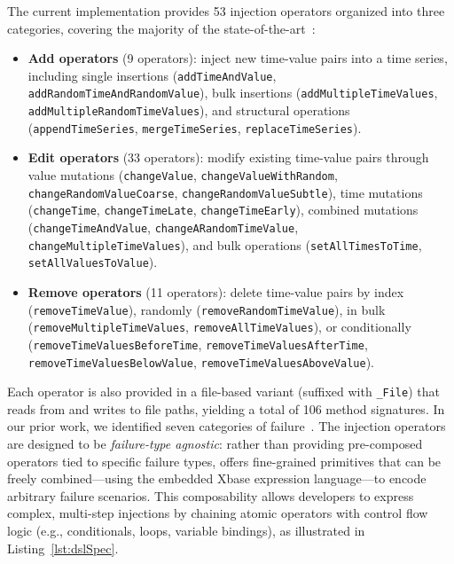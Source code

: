 The current implementation provides 53 injection operators organized into three categories, covering the majority of the state-of-the-art~\citep{gomez-abajo_wodel-test_2021,cotroneo_profipy_2020}:
\begin{itemize}
    \item \textbf{Add operators} (9 operators): inject new time-value pairs into a time series, including single insertions (\texttt{addTimeAndValue}, \texttt{addRandomTimeAndRandomValue}), bulk insertions (\texttt{addMultipleTimeValues}, \texttt{addMultipleRandomTimeValues}), and structural operations (\texttt{appendTimeSeries}, \texttt{mergeTimeSeries}, \texttt{replaceTimeSeries}).
    \item \textbf{Edit operators} (33 operators): modify existing time-value pairs through value mutations (\texttt{changeValue}, \texttt{changeValueWithRandom}, \texttt{changeRandomValueCoarse}, \texttt{changeRandomValueSubtle}), time mutations (\texttt{changeTime}, \texttt{changeTimeLate}, \texttt{changeTimeEarly}), combined mutations (\texttt{changeTimeAndValue}, \texttt{changeARandomTimeValue}, \texttt{changeMultipleTimeValues}), and bulk operations (\texttt{setAllTimesToTime}, \texttt{setAllValuesToValue}).
    \item \textbf{Remove operators} (11 operators): delete time-value pairs by index (\texttt{removeTimeValue}), randomly (\texttt{removeRandomTimeValue}), in bulk (\texttt{removeMultipleTimeValues}, \texttt{removeAllTimeValues}), or conditionally (\texttt{removeTimeValuesBeforeTime}, \texttt{removeTimeValuesAfterTime}, \texttt{removeTimeValuesBelowValue}, \texttt{removeTimeValuesAboveValue}).
\end{itemize}
Each operator is also provided in a file-based variant (suffixed with \texttt{\_File}) that reads from and writes to file paths, yielding a total of 106 method signatures. In our prior work, we identified seven categories of failure~\citep{10350526}. The injection operators are designed to be \textit{failure-type agnostic}: rather than providing pre-composed operators tied to specific failure types, \tool offers fine-grained primitives that can be freely combined—using the embedded Xbase expression language—to encode arbitrary failure scenarios. This composability allows developers to express complex, multi-step injections by chaining atomic operators with control flow logic (e.g., conditionals, loops, variable bindings), as illustrated in Listing~\ref{lst:dslSpec}.

